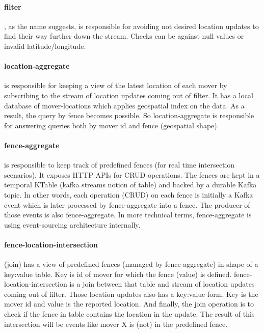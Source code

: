 \documentclass[a4]{report}
\begin{document}
        \paragraph{filter}, as the name suggests, is responsible  for avoiding not desired location updates to find their
        way further down the stream.
        Checks can be against null values or invalid latitude/longitude.

        \paragraph{location-aggregate} is responsible for keeping a view of the latest location of each mover by
        subscribing to the stream of location updates coming out of filter.
        It has a local database of mover-locations which applies geospatial index on the data.
        As a result, the query by fence becomes possible.
        So location-aggregate is responsible for answering queries both by mover id and fence (geospatial shape).

        \paragraph{fence-aggregate} is responsible to keep track of predefined fences (for real time intersection scenarios).
        It exposes HTTP APIs for CRUD operations.
        The fences are kept in a temporal KTable (kafka streams notion of table) and backed by a durable Kafka topic.
        In other words, each operation (CRUD) on each fence is initially a Kafka event which is later processed by
        fence-aggregate into a fence.
        The producer of those events is also fence-aggregate.
        In more technical terms, fence-aggregate is using event-sourcing architecture internally.

        \paragraph{fence-location-intersection} (join) has a view of predefined fences (managed by fence-aggregate) in
        shape of a key:value table.
        Key is id of mover for which the fence (value) is defined.
        fence-location-intersection is a join between that table and stream of location updates coming out of filter.
        Those location updates also has a key:value form.
        Key is the mover id and value is the reported location.
        And finally, the join operation is to check if the fence in table contains the location in the update.
        The result of this intersection will be events like mover X is (not) in the predefined fence.
\end{document}
